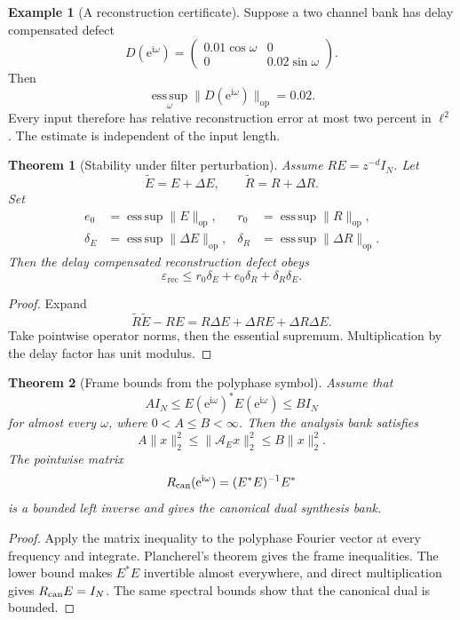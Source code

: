 \documentclass[11pt,letterpaper]{article}
\newtheorem{theorem}{Theorem}[section]
\theoremstyle{plain}
\theoremstyle{plain}
\theoremstyle{plain}
\theoremstyle{definition}
\theoremstyle{definition}
\newtheorem{example}[example]{Example}
\theoremstyle{definition}
\theoremstyle{definition}
\theoremstyle{remark}
\theoremstyle{remark}
\theoremstyle{remark}
\theoremstyle{remark}
\newcommand{\ii}{\mathrm i}
\newcommand{\Acal}{\mathcal A}
\newcommand{\esssup}{\operatorname*{ess\,sup}}
\newcommand{\e}{\mathrm e}
\begin{document}
\begin{example}[A reconstruction certificate]\label{ex:reconstruction_certificate}
Suppose a two channel bank has delay compensated defect
\[
D(\e^{\ii\omega})
=
\begin{pmatrix}
0.01\cos\omega&0\\
0&0.02\sin\omega
\end{pmatrix}.
\]
Then
\[
\esssup_\omega\|D(\e^{\ii\omega})\|_{\mathrm{op}}
=0.02.
\]
Every input therefore has relative reconstruction error at most two percent in \(\ell^2\). The estimate is independent of the input length.
\end{example}

\begin{theorem}[Stability under filter perturbation]\label{thm:filter_perturbation}
Assume \(RE=z^{-d}I_N\). Let
\[
\widetilde E=E+\Delta E,
\qquad
\widetilde R=R+\Delta R.
\]
Set
\[
\begin{aligned}
e_0&=\esssup\|E\|_{\mathrm{op}},
& r_0&=\esssup\|R\|_{\mathrm{op}},\\
\delta_E&=\esssup\|\Delta E\|_{\mathrm{op}},
& \delta_R&=\esssup\|\Delta R\|_{\mathrm{op}}.
\end{aligned}
\]
Then the delay compensated reconstruction defect obeys
\[
\varepsilon_{\mathrm{rec}}
\leq
r_0\delta_E+e_0\delta_R+\delta_R\delta_E.
\]
\end{theorem}

\begin{proof}
Expand
\[
\widetilde R\widetilde E-RE
=
R\Delta E+\Delta R E+\Delta R\Delta E.
\]
Take pointwise operator norms, then the essential supremum. Multiplication by the delay factor has unit modulus.
\end{proof}

\begin{theorem}[Frame bounds from the polyphase symbol]\label{thm:frame_bounds}
Assume that
\[
A I_N
\leq
E(\e^{\ii\omega})^*E(\e^{\ii\omega})
\leq
B I_N
\]
for almost every \(\omega\), where \(0<A\leq B<\infty\). Then the analysis bank satisfies
\[
A\|x\|_2^2
\leq
\|\Acal_E x\|_2^2
\leq
B\|x\|_2^2.
\]
The pointwise matrix
\[
R_{\rm can}(\e^{\ii\omega})
=
(E^*E)^{-1}E^*
\]
is a bounded left inverse and gives the canonical dual synthesis bank.
\end{theorem}

\begin{proof}
Apply the matrix inequality to the polyphase Fourier vector at every frequency and integrate. Plancherel's theorem gives the frame inequalities. The lower bound makes \(E^*E\) invertible almost everywhere, and direct multiplication gives \(R_{\rm can}E=I_N\). The same spectral bounds show that the canonical dual is bounded.
\end{proof}
\end{document}
